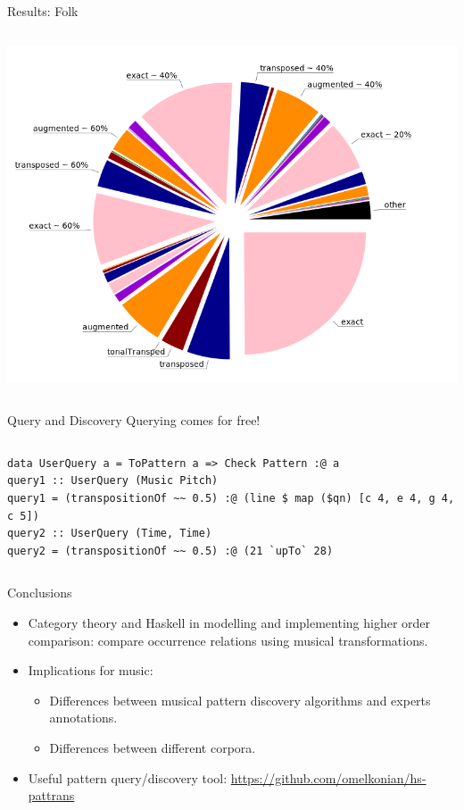 \documentclass[final]{beamer}
\begin{document}
\begin{frame}[label={sec:orgd59d0ad},fragile]{}
\begin{columns}
\begin{column}[t]{0.47\columnwidth}
\begin{block}{Results: Folk}
\begin{columns}
\begin{column}[T]{0.50\columnwidth}
\begin{center}
\includegraphics[width=.9\linewidth]{./img/fe.png}
\end{center}
\end{column}
\end{columns}
\end{block}
\begin{block}{Query and Discovery}
Querying comes for free!

\begin{columns}
\begin{column}[T]{0.80\columnwidth}
\small
\begin{verbatim}
data UserQuery a = ToPattern a => Check Pattern :@ a
query1 :: UserQuery (Music Pitch)
query1 = (transpositionOf ~~ 0.5) :@ (line $ map ($qn) [c 4, e 4, g 4, c 5])
query2 :: UserQuery (Time, Time)
query2 = (transpositionOf ~~ 0.5) :@ (21 `upTo` 28)
\end{verbatim}
\end{column}
\end{columns}
\end{block}

\begin{block}{Conclusions}
\begin{itemize}
\item Category theory and Haskell in modelling and implementing higher order comparison: compare occurrence relations using musical transformations.
\item Implications for music: 
\begin{itemize}
\item Differences between musical pattern discovery algorithms and experts annotations.
\item Differences between different corpora.
\end{itemize}
\item Useful pattern query/discovery tool: \url{https://github.com/omelkonian/hs-pattrans}
\end{itemize}
\end{block}
\end{column}
\end{columns}
\end{frame}
\end{document}
